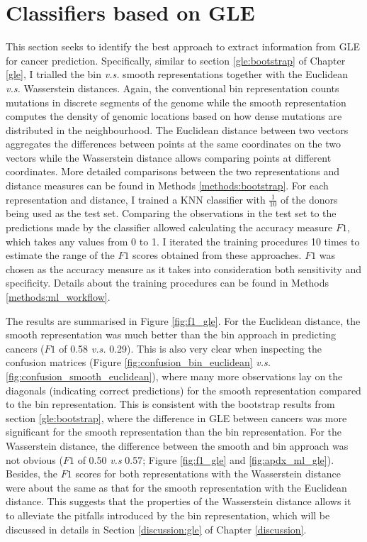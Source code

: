 \section{Classifiers based on GLE}\label{ml:gle}
This section seeks to identify the best approach to extract information from GLE for cancer prediction. Specifically, similar to section \ref{gle:bootstrap} of Chapter \ref{gle}, I trialled the bin \textit{v.s.} smooth representations together with the Euclidean \textit{v.s.} Wasserstein distances. Again, the conventional bin representation counts mutations in discrete segments of the genome while the smooth representation computes the density of genomic locations based on how dense mutations are distributed in the neighbourhood. The Euclidean distance between two vectors aggregates the differences between points at the same coordinates on the two vectors while the Wasserstein distance allows comparing points at different coordinates. More detailed comparisons between the two representations and distance measures can be found in Methods \ref{methods:bootstrap}. For each representation and distance, I trained a KNN classifier with $\frac{1}{10}$ of the donors being used as the test set. Comparing the observations in the test set to the predictions made by the classifier allowed calculating the accuracy measure $F1$, which takes any values from 0 to 1. I iterated the training procedures 10 times to estimate the range of the $F1$ scores obtained from these approaches. $F1$ was chosen as the accuracy measure as it takes into consideration both sensitivity and specificity. Details about the training procedures can be found in Methods \ref{methods:ml_workflow}.

The results are summarised in Figure \ref{fig:f1_gle}. For the Euclidean distance, the smooth representation was much better than the bin approach in predicting cancers ($F1$ of 0.58 \textit{v.s.} 0.29). This is also very clear when inspecting the confusion matrices (Figure \ref{fig:confusion_bin_euclidean} \textit{v.s.} \ref{fig:confusion_smooth_euclidean}), where many more observations lay on the diagonals (indicating correct predictions) for the smooth representation compared to the bin representation. This is consistent with the bootstrap results from section \ref{gle:bootstrap}, where the difference in GLE between cancers was more significant for the smooth representation than the bin representation. For the Wasserstein distance, the difference between the smooth and bin approach was not obvious ($F1$ of 0.50 \textit{v.s} 0.57; Figure \ref{fig:f1_gle} and \ref{fig:apdx_ml_gle}). Besides, the $F1$ scores for both representations with the Wasserstein distance were about the same as that for the smooth representation with the Euclidean distance. This suggests that the properties of the Wasserstein distance allows it to alleviate the pitfalls introduced by the bin representation, which will be discussed in details in Section \ref{discussion:gle} of Chapter \ref{discussion}. 

